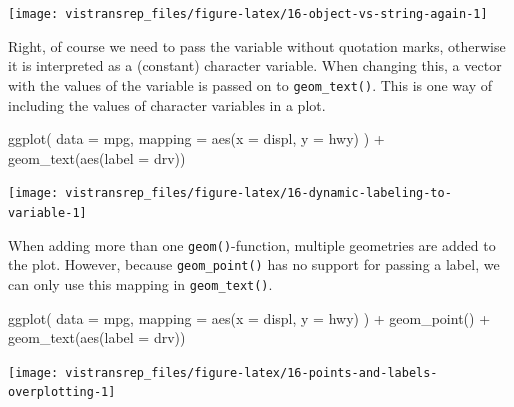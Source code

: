 \documentclass[]{book}
\newenvironment{Shaded}{}{}
\newcommand{\DataTypeTok}[1]{#1}
\newcommand{\KeywordTok}[1]{\textcolor[rgb]{0.00,0.00,1.00}{#1}}
\newcommand{\NormalTok}[1]{#1}
\newcommand{\OperatorTok}[1]{#1}
\newcommand{\StringTok}[1]{\textcolor[rgb]{0.00,0.50,0.50}{#1}}
\begin{document}
\begin{flushright}\texttt{[image: vistransrep\_files/figure-latex/16-object-vs-string-again-1]} \end{flushright}

Right, of course we need to pass the variable without quotation marks, otherwise it is interpreted as a (constant) character variable.
When changing this, a vector with the values of the variable is passed on to \texttt{geom\_text()}.
This is one way of including the values of character variables in a plot.

\begin{Shaded}
\begin{Highlighting}[]
\KeywordTok{ggplot}\NormalTok{(}
  \DataTypeTok{data =}\NormalTok{ mpg,}
  \DataTypeTok{mapping =} \KeywordTok{aes}\NormalTok{(}\DataTypeTok{x =}\NormalTok{ displ, }\DataTypeTok{y =}\NormalTok{ hwy)}
\NormalTok{) }\OperatorTok{+}
\StringTok{  }\KeywordTok{geom_text}\NormalTok{(}\KeywordTok{aes}\NormalTok{(}\DataTypeTok{label =}\NormalTok{ drv))}
\end{Highlighting}
\end{Shaded}

\begin{flushright}\texttt{[image: vistransrep\_files/figure-latex/16-dynamic-labeling-to-variable-1]} \end{flushright}

When adding more than one \texttt{geom()}-function, multiple geometries are added to the plot.
However, because \texttt{geom\_point()} has no support for passing a label, we can only use this mapping in \texttt{geom\_text()}.

\begin{Shaded}
\begin{Highlighting}[]
\KeywordTok{ggplot}\NormalTok{(}
  \DataTypeTok{data =}\NormalTok{ mpg,}
  \DataTypeTok{mapping =} \KeywordTok{aes}\NormalTok{(}\DataTypeTok{x =}\NormalTok{ displ, }\DataTypeTok{y =}\NormalTok{ hwy)}
\NormalTok{) }\OperatorTok{+}
\StringTok{  }\KeywordTok{geom_point}\NormalTok{() }\OperatorTok{+}
\StringTok{  }\KeywordTok{geom_text}\NormalTok{(}\KeywordTok{aes}\NormalTok{(}\DataTypeTok{label =}\NormalTok{ drv))}
\end{Highlighting}
\end{Shaded}

\begin{flushright}\texttt{[image: vistransrep\_files/figure-latex/16-points-and-labels-overplotting-1]} \end{flushright}
\end{document}
